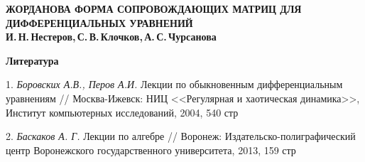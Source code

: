 \documentclass[10pt,a4paper,oneside]{article}
\begin{document}
 
\begin{center}
    \textbf{\LARGE ЖОРДАНОВА ФОРМА СОПРОВОЖДАЮЩИХ МАТРИЦ ДЛЯ ДИФФЕРЕНЦИАЛЬНЫХ УРАВНЕНИЙ} \\[1em]
    \textbf{И.\,Н.\,Нестеров,\,С.\,В.\,Клочков,\,А.\,С.\,Чурсанова} \\[2em]
\end{center}





\vfill

\smallskip \centerline{\bf Литература}\nopagebreak

1. \textit{ Боровских А.В., Перов А.И.} Лекции по обыкновенным дифференциальным уравнениям // Москва-Ижевск: НИЦ  <<Регулярная и хаотическая динамика>>, Институт компьютерных исследований, 2004, 540 стр

2. \textit{ Баскаков А. Г.} Лекции по алгебре // Воронеж: Издательско-полиграфический центр Воронежского государственного университета, 2013, 159 стр
\end{document}
